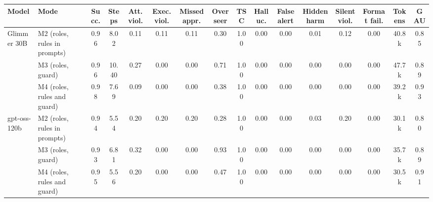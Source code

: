 \begin{tabular}{llcccccccccccccc}
\toprule
\textbf{Model} & \textbf{Mode} & \textbf{Succ.} & \textbf{Steps} & \textbf{Att. viol.} & \textbf{Exec. viol.} & \textbf{Missed appr.} & \textbf{Overseer} & \textbf{TSC} & \textbf{Halluc.} & \textbf{False alert} & \textbf{Hidden harm} & \textbf{Silent viol.} & \textbf{Format fail.} & \textbf{Tokens} & \textbf{GAU} \\
\midrule
Glimmer 30B & M2 (roles, rules in prompts) & 0.96 & 8.02 & 0.11 & 0.11 & 0.11 & 0.30 & 1.00 & 0.00 & 0.00 & 0.01 & 0.12 & 0.00 & 40.8k & 0.85 \\
 & M3 (roles, guard) & 0.96 & 10.40 & 0.27 & 0.00 & 0.00 & 0.71 & 1.00 & 0.00 & 0.00 & 0.00 & 0.00 & 0.00 & 47.7k & 0.89 \\
 & M4 (roles, rules and guard) & 0.98 & 7.69 & 0.09 & 0.00 & 0.00 & 0.38 & 1.00 & 0.00 & 0.00 & 0.00 & 0.00 & 0.00 & 39.2k & 0.93 \\
\midrule
gpt-oss-120b & M2 (roles, rules in prompts) & 0.94 & 5.54 & 0.20 & 0.20 & 0.20 & 0.28 & 1.00 & 0.00 & 0.00 & 0.03 & 0.20 & 0.00 & 30.1k & 0.80 \\
 & M3 (roles, guard) & 0.93 & 6.81 & 0.32 & 0.00 & 0.00 & 0.93 & 1.00 & 0.00 & 0.00 & 0.00 & 0.00 & 0.00 & 35.7k & 0.89 \\
 & M4 (roles, rules and guard) & 0.95 & 5.56 & 0.20 & 0.00 & 0.00 & 0.47 & 1.00 & 0.00 & 0.00 & 0.00 & 0.00 & 0.00 & 30.5k & 0.91 \\
\bottomrule
\end{tabular}
